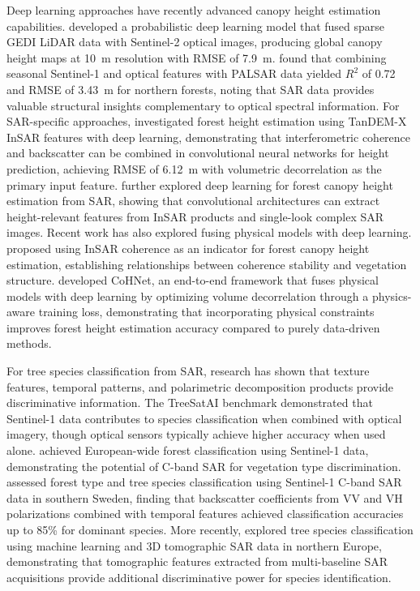 Deep learning approaches have recently advanced canopy height estimation capabilities. \cite{lang_high-resolution_2023} developed a probabilistic deep learning model that fused sparse GEDI LiDAR data with Sentinel-2 optical images, producing global canopy height maps at 10~m resolution with RMSE of 7.9~m. \cite{castro_deep_2024} found that combining seasonal Sentinel-1 and optical features with PALSAR data yielded $R^2$ of 0.72 and RMSE of 3.43~m for northern forests, noting that SAR data provides valuable structural insights complementary to optical spectral information. For SAR-specific approaches, \cite{mahesh_forest_2024} investigated forest height estimation using TanDEM-X InSAR features with deep learning, demonstrating that interferometric coherence and backscatter can be combined in convolutional neural networks for height prediction, achieving RMSE of 6.12~m with volumetric decorrelation as the primary input feature. \cite{mahesh_deep_2023} further explored deep learning for forest canopy height estimation from SAR, showing that convolutional architectures can extract height-relevant features from InSAR products and single-look complex SAR images. Recent work has also explored fusing physical models with deep learning. \cite{wei_forest_2024} proposed using InSAR coherence as an indicator for forest canopy height estimation, establishing relationships between coherence stability and vegetation structure. \cite{mahesh_better_2025} developed CoHNet, an end-to-end framework that fuses physical models with deep learning by optimizing volume decorrelation through a physics-aware training loss, demonstrating that incorporating physical constraints improves forest height estimation accuracy compared to purely data-driven methods.

For tree species classification from SAR, research has shown that texture features, temporal patterns, and polarimetric decomposition products provide discriminative information. The TreeSatAI benchmark \cite{ahlswede_treesatai_2023} demonstrated that Sentinel-1 data contributes to species classification when combined with optical imagery, though optical sensors typically achieve higher accuracy when used alone. \cite{dostalova_european_2021} achieved European-wide forest classification using Sentinel-1 data, demonstrating the potential of C-band SAR for vegetation type discrimination. \cite{udali_assessing_2021} assessed forest type and tree species classification using Sentinel-1 C-band SAR data in southern Sweden, finding that backscatter coefficients from VV and VH polarizations combined with temporal features achieved classification accuracies up to 85\% for dominant species. More recently, \cite{grace_tree_2024} explored tree species classification using machine learning and 3D tomographic SAR data in northern Europe, demonstrating that tomographic features extracted from multi-baseline SAR acquisitions provide additional discriminative power for species identification.

